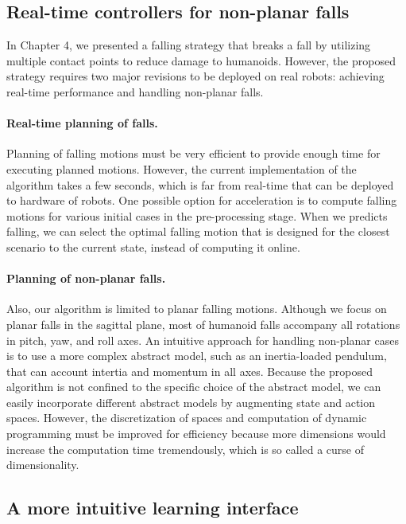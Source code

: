 \subsection{Real-time controllers for non-planar falls}
In Chapter 4, we presented a falling strategy that breaks a fall by
utilizing multiple contact points to reduce damage to humanoids.
However, the proposed strategy requires two major revisions to be deployed 
on real robots: achieving real-time performance and handling non-planar falls.

\paragraph{Real-time planning of falls.}
Planning of falling motions must be very efficient to provide enough time for
executing planned motions. 
However, the current implementation of the algorithm takes a few seconds, which
is far from real-time that can be deployed to hardware of robots.
One possible option for acceleration is to compute falling motions for
various initial cases in the pre-processing stage.
When we predicts falling, we can select the optimal falling motion
that is designed for the closest scenario to the current state,
instead of computing it online.

\paragraph{Planning of non-planar falls.}
Also, our algorithm is limited to planar falling motions.
Although we focus on planar falls in the sagittal plane, most of humanoid falls
accompany all rotations in pitch, yaw, and roll axes.
An intuitive approach for handling non-planar cases is to use a more complex
abstract model, such as an inertia-loaded pendulum, that can account intertia
and momentum in all axes.
Because the proposed algorithm is not confined to the specific choice of the
abstract model, we can easily incorporate different abstract models by
augmenting state and action spaces. 
However, the discretization of spaces and computation of dynamic programming
must be improved for efficiency because more dimensions would increase the
computation time tremendously, which is so called a curse of dimensionality. 

\subsection{A more intuitive learning interface}

